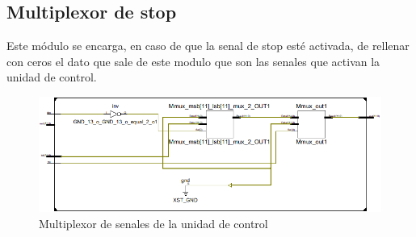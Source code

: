 \subsection{Multiplexor de stop}
Este m\'odulo se encarga, en caso de que la senal de stop est\'e activada, de rellenar con ceros el dato que sale de este modulo que son las senales que activan la unidad de control.

\begin{figure}[H]
\centering
\includegraphics[scale=0.5]{img/multiplexor_inside}
\caption{Multiplexor de senales de la unidad de control}
\label{fig:sign_extended}
\end{figure}
